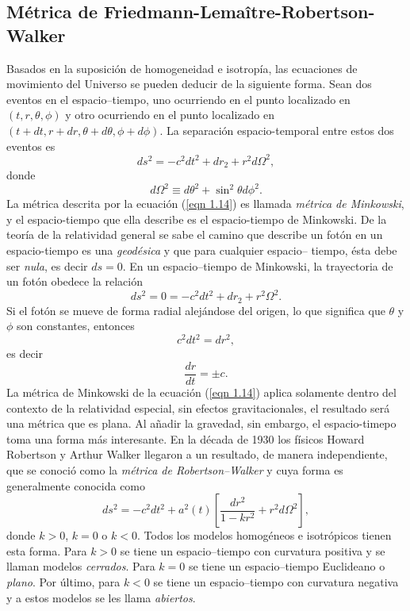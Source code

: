 \documentclass[a4paper,openright,12pt]{book}
\begin{document}

\subsection*{Métrica de Friedmann-Lemaître-Robertson-Walker}
Basados en la suposición de homogeneidad e isotropía, las ecuaciones de movimiento del Universo se pueden deducir de la siguiente forma. Sean dos eventos en el espacio--tiempo, uno ocurriendo en el punto localizado en $(t,r,\theta , \phi)$ y otro ocurriendo en el punto localizado en $(t +dt, r + dr, \theta + d\theta, \phi + d\phi)$. La separación espacio-temporal entre estos dos eventos es
\begin{equation}
ds^{2}=-c^{2}dt^{2} + dr_{2} +r^{2}d\Omega^{2},\label{eqn 1.14}
\end{equation}
donde
\begin{equation*}
d\Omega^{2} \equiv d\theta^{2} + \sin^{2}\theta d\phi^{2}.
\end{equation*}
La métrica descrita por la ecuación (\ref{eqn 1.14}) es llamada \textit{métrica de Minkowski}, y el espacio-tiempo que ella describe es el espacio-tiempo de Minkowski. De la teoría de la relatividad general se sabe el camino que describe un fotón en un espacio-tiempo es una \textit{geodésica} y que para cualquier espacio-- tiempo, ésta debe ser \textit{nula}, es decir $ds=0$. En un espacio--tiempo de Minkowski, la trayectoria de un fotón obedece la relación
\begin{equation}
ds^{2}=0 = -c^{2}dt^{2} + dr_{2} +r^{2}\Omega^{2}.\label{eqn 1.15}
\end{equation}
Si el fotón se mueve de forma radial alejándose del origen, lo que significa que $\theta$ y $\phi$ son constantes, entonces
\begin{equation}
c^{2}dt^{2}=dr^{2},\label{eqn 1.16}
\end{equation}
es decir
\begin{equation}
\frac{dr}{dt}=\pm c. \label{eqn 1.17}
\end{equation}
La métrica de Minkowski de la ecuación (\ref{eqn 1.14}) aplica solamente dentro del contexto de la relatividad especial, sin efectos gravitacionales, el resultado será una  métrica que es plana. Al añadir la gravedad, sin embargo, el espacio-timepo toma una forma más interesante. En la década de 1930 los físicos Howard Robertson y Arthur Walker llegaron a un resultado, de manera independiente, que se conoció como la \textit{métrica de Robertson--Walker} y cuya forma es generalmente conocida como
\begin{equation}
ds^{2}
=
-c^{2}dt^{2} + a^{2}(t)
\left[
\frac{dr^{2}}{1-k r^{2}} + r^{2}d\Omega^{2}
\right],\label{eqn 1.18}
\end{equation}
donde $k > 0$, $k = 0$ o $k < 0$. Todos los modelos homogéneos e isotrópicos tienen esta forma. Para $k > 0$ se tiene un espacio--tiempo con curvatura positiva y se llaman modelos \textit{cerrados}. Para $k = 0$ se tiene un espacio--tiempo Euclideano o \textit{plano}. Por último, para $k < 0$ se tiene un espacio--tiempo con curvatura negativa y a estos modelos se les llama \textit{abiertos}.
\end{document}
